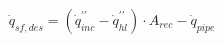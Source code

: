 \documentclass[10pt,letterpaper]{article}
\begin{document}
\begin{equation}
\dot{q}_{sf, des} = \left( \dot{q}^{\prime \prime}_{inc} - \dot{q}^{\prime \prime}_{hl} \right) \cdot A_{rec} - \dot{q}_{pipe}
\end{equation}
\end{document}
